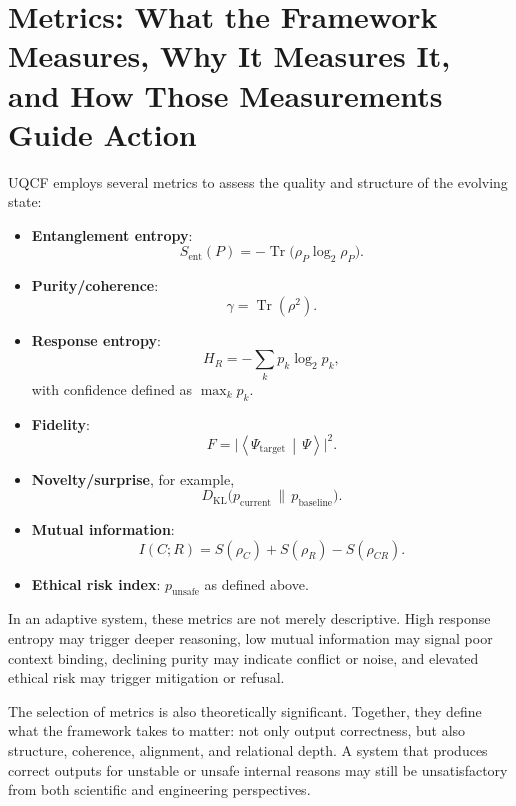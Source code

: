 \documentclass[12pt]{article}
\newcommand{\braket}[2]{\left\langle#1\,\middle|\,#2\right\rangle}
\newcommand{\Tr}{\operatorname{Tr}}
\newcommand{\KL}{D_{\mathrm{KL}}}
\begin{document}
\section{Metrics: What the Framework Measures, Why It Measures It, and How Those Measurements Guide Action}\label{sec:metrics}
UQCF employs several metrics to assess the quality and structure of the evolving state:
\begin{itemize}[leftmargin=2em]
    \item \textbf{Entanglement entropy}:
    \begin{equation}
    S_{\text{ent}}(P) = -\Tr\big(\rho_P\log_2\rho_P\big).
    \end{equation}
    \item \textbf{Purity/coherence}:
    \begin{equation}
    \gamma = \Tr(\rho^2).
    \end{equation}
    \item \textbf{Response entropy}:
    \begin{equation}
    H_R = -\sum_k p_k \log_2 p_k,
    \end{equation}
    with confidence defined as $\max_k p_k$.
    \item \textbf{Fidelity}:
    \begin{equation}
    F = \big|\braket{\Psi_{\text{target}}}{\Psi}\big|^2.
    \end{equation}
    \item \textbf{Novelty/surprise}, for example,
    \begin{equation}
    \KL\big(p_{\text{current}}\,\|\,p_{\text{baseline}}\big).
    \end{equation}
    \item \textbf{Mutual information}:
    \begin{equation}
    I(C;R) = S(\rho_C) + S(\rho_R) - S(\rho_{CR}).
    \end{equation}
    \item \textbf{Ethical risk index}: $p_{\text{unsafe}}$ as defined above.
\end{itemize}

In an adaptive system, these metrics are not merely descriptive. High response entropy may trigger deeper reasoning, low mutual information may signal poor context binding, declining purity may indicate conflict or noise, and elevated ethical risk may trigger mitigation or refusal.

The selection of metrics is also theoretically significant. Together, they define what the framework takes to matter: not only output correctness, but also structure, coherence, alignment, and relational depth. A system that produces correct outputs for unstable or unsafe internal reasons may still be unsatisfactory from both scientific and engineering perspectives.
\end{document}
